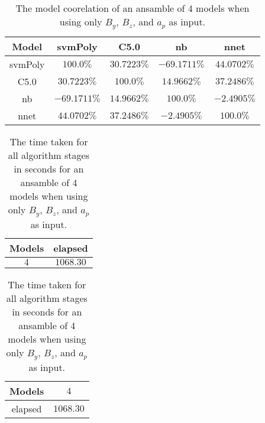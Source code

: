 \begin{table}[!ht]
	\centering
	\begin{tabular}{|c|c|c|c|c|}
		\hline
		Model & svmPoly & C5.0 & nb & nnet \\ \hline
		svmPoly & $100.0\%$ & $30.7223\%$ & $-69.1711\%$ & $44.0702\%$ \\ \hline
		C5.0 & $30.7223\%$ & $100.0\%$ & $14.9662\%$ & $37.2486\%$ \\ \hline
		nb & $-69.1711\%$ & $14.9662\%$ & $100.0\%$ & $-2.4905\%$ \\ \hline
		nnet & $44.0702\%$ & $37.2486\%$ & $-2.4905\%$ & $100.0\%$ \\ \hline
	\end{tabular}
	\caption{The model coorelation of an ansamble of 4 models when using only $B_{y}$, $B_{z}$, and $a_{p}$ as input.}
	\label{tab:ansamble4:yzap}
\end{table}

\begin{table}[!ht]
	\centering
	\begin{tabular}{|c|c|}
		\hline
		Models & elapsed \\ \hline
		$4$ & $1068.30$ \\ \hline
	\end{tabular}
	\caption{The time taken for all algorithm stages in seconds for an ansamble of 4 models when using only $B_{y}$, $B_{z}$, and $a_{p}$ as input.}
	\label{tab:time:ansamble:yzap:4}
\end{table}

\begin{table}[!ht]
	\centering
	\begin{tabular}{|c|c|}
		\hline
		Models & $4$ \\ \hline
		elapsed & $1068.30$ \\ \hline
	\end{tabular}
	\caption{The time taken for all algorithm stages in seconds for an ansamble of 4 models when using only $B_{y}$, $B_{z}$, and $a_{p}$ as input.}
	\label{tab:time:ansamble:reverse:yzap:4}
\end{table}

